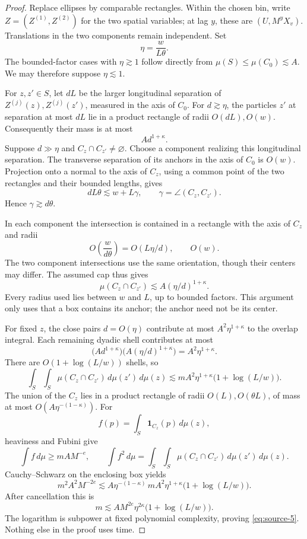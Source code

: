\begin{proof}
Replace ellipses by comparable rectangles.  Within the chosen bin,
write \(Z=(Z^{(1)},Z^{(2)})\) for the two spatial variables; at lag
\(y\), these are \((U,M^yX_v)\).  Translations in the two components
remain independent.  Set
\[
\eta=\frac{w}{L\theta}.
\]
The bounded-factor cases with \(\eta\gtrsim1\) follow directly from
\(\mu(S)\le\mu(C_0)\lesssim A\).  We may therefore suppose
\(\eta\lesssim1\).

For \(z,z'\in S\), let \(dL\) be the larger longitudinal separation
of \(Z^{(j)}(z),Z^{(j)}(z')\), measured in the axis of \(C_0\).
For \(d\gtrsim\eta\), the particles \(z'\) at separation at most
\(dL\) lie in a product rectangle of radii \(O(dL),O(w)\).
Consequently their mass is at most
\[
A d^{1+\kappa}.
\]
Suppose \(d\gg\eta\) and \(C_z\cap C_{z'}\ne\varnothing\).
Choose a component realizing this longitudinal separation.  The
transverse separation of its anchors in the axis of \(C_0\) is
\(O(w)\).  Projection onto a normal to the axis of \(C_z\), using
a common point of the two rectangles and their bounded lengths,
gives
\[
dL\theta\lesssim w+L\gamma,
\qquad
\gamma=\angle(C_z,C_{z'}).
\]
Hence \(\gamma\gtrsim d\theta\).

In each component the intersection is contained in a rectangle
with the axis of \(C_z\) and radii
\[
O\!\left(\frac{w}{d\theta}\right)=O(L\eta/d),
\qquad O(w).
\]
The two component intersections use the same orientation, though
their centers may differ.  The assumed cap thus gives
\[
\mu(C_z\cap C_{z'})
\lesssim A(\eta/d)^{1+\kappa}.
\]
Every radius used lies between \(w\) and \(L\), up to bounded
factors.  This argument only uses that a box contains its anchor;
the anchor need not be its center.

For fixed \(z\), the close pairs \(d=O(\eta)\) contribute at most
\(A^2\eta^{1+\kappa}\) to the overlap integral.  Each remaining
dyadic shell contributes at most
\[
\bigl(A d^{1+\kappa}\bigr)
\bigl(A(\eta/d)^{1+\kappa}\bigr)
=A^2\eta^{1+\kappa}.
\]
There are \(O(1+\log(L/w))\) shells, so
\[
\int_S\int_S\mu(C_z\cap C_{z'})\,d\mu(z')\,d\mu(z)
\lesssim mA^2\eta^{1+\kappa}\bigl(1+\log(L/w)\bigr).
\]
The union of the \(C_z\) lies in a product rectangle of radii
\(O(L),O(\theta L)\), of mass at most
\(O(A\eta^{-(1-\kappa)})\).  For
\[
f(p)=\int_S\mathbf1_{C_z}(p)\,d\mu(z),
\]
heaviness and Fubini give
\[
\int f\,d\mu\ge mAM^{-e},
\qquad
\int f^2\,d\mu
=\int_S\int_S\mu(C_z\cap C_{z'})\,d\mu(z')\,d\mu(z).
\]
Cauchy--Schwarz on the enclosing box yields
\[
m^2A^2M^{-2e}
\lesssim A\eta^{-(1-\kappa)}
\,mA^2\eta^{1+\kappa}\bigl(1+\log(L/w)\bigr).
\]
After cancellation this is
\[
m\lesssim A M^{2e}\eta^{2\kappa}\bigl(1+\log(L/w)\bigr).
\]
The logarithm is subpower at fixed polynomial complexity, proving
\eqref{eq:source-5}.  Nothing else in the proof uses time.
\end{proof}


